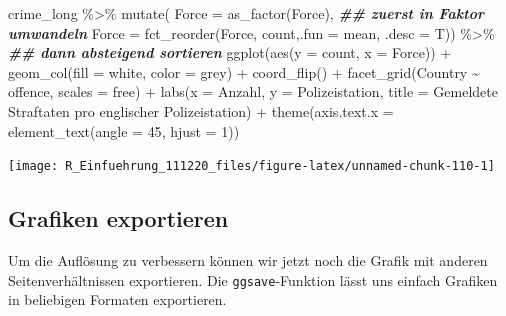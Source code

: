 \documentclass[
]{book}
\newenvironment{Shaded}{\begin{snugshade}}{\end{snugshade}}
\newcommand{\AttributeTok}[1]{\textcolor[rgb]{0.77,0.63,0.00}{#1}}
\newcommand{\DecValTok}[1]{\textcolor[rgb]{0.00,0.00,0.81}{#1}}
\newcommand{\DocumentationTok}[1]{\textcolor[rgb]{0.56,0.35,0.01}{\textbf{\textit{#1}}}}
\newcommand{\FunctionTok}[1]{\textcolor[rgb]{0.00,0.00,0.00}{#1}}
\newcommand{\NormalTok}[1]{#1}
\newcommand{\SpecialCharTok}[1]{\textcolor[rgb]{0.00,0.00,0.00}{#1}}
\newcommand{\StringTok}[1]{\textcolor[rgb]{0.31,0.60,0.02}{#1}}
\begin{document}
\begin{Shaded}
\begin{Highlighting}[]
\NormalTok{crime\_long }\SpecialCharTok{\%\textgreater{}\%} 
  \FunctionTok{mutate}\NormalTok{(}
      \AttributeTok{Force =} \FunctionTok{as\_factor}\NormalTok{(Force), }\DocumentationTok{\#\# zuerst in Faktor umwandeln}
      \AttributeTok{Force =} \FunctionTok{fct\_reorder}\NormalTok{(Force, count,}\AttributeTok{.fun =}\NormalTok{ mean, }\AttributeTok{.desc =}\NormalTok{ T)) }\SpecialCharTok{\%\textgreater{}\%} \DocumentationTok{\#\# dann absteigend sortieren}
\FunctionTok{ggplot}\NormalTok{(}\FunctionTok{aes}\NormalTok{(}\AttributeTok{y =}\NormalTok{ count,}
             \AttributeTok{x =}\NormalTok{ Force)) }\SpecialCharTok{+}
  \FunctionTok{geom\_col}\NormalTok{(}\AttributeTok{fill =} \StringTok{\textquotesingle{}white\textquotesingle{}}\NormalTok{,}
           \AttributeTok{color =} \StringTok{\textquotesingle{}grey\textquotesingle{}}\NormalTok{) }\SpecialCharTok{+}
  \FunctionTok{coord\_flip}\NormalTok{() }\SpecialCharTok{+}
  \FunctionTok{facet\_grid}\NormalTok{(Country }\SpecialCharTok{\textasciitilde{}}\NormalTok{ offence, }
             \AttributeTok{scales =} \StringTok{\textquotesingle{}free\textquotesingle{}}\NormalTok{) }\SpecialCharTok{+}
  \FunctionTok{labs}\NormalTok{(}\AttributeTok{x =} \StringTok{\textquotesingle{}Anzahl\textquotesingle{}}\NormalTok{,}
       \AttributeTok{y =} \StringTok{\textquotesingle{}Polizeistation\textquotesingle{}}\NormalTok{,}
       \AttributeTok{title =} \StringTok{\textquotesingle{}Gemeldete Straftaten pro englischer Polizeistation\textquotesingle{}}\NormalTok{) }\SpecialCharTok{+}
  \FunctionTok{theme}\NormalTok{(}\AttributeTok{axis.text.x =} \FunctionTok{element\_text}\NormalTok{(}\AttributeTok{angle =} \DecValTok{45}\NormalTok{,}
                                   \AttributeTok{hjust =} \DecValTok{1}\NormalTok{))}
\end{Highlighting}
\end{Shaded}

\begin{center}\texttt{[image: R\_Einfuehrung\_111220\_files/figure-latex/unnamed-chunk-110-1]} \end{center}

\hypertarget{grafiken-exportieren}{%
\subsection{Grafiken exportieren}\label{grafiken-exportieren}}

Um die Auflösung zu verbessern können wir jetzt noch die Grafik mit anderen Seitenverhältnissen exportieren. Die \texttt{ggsave}-Funktion lässt uns einfach Grafiken in beliebigen Formaten exportieren.
\end{document}
